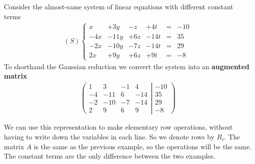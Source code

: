 \documentclass[usenames,dvipsnames,aspectratio=169,10pt]{beamer}
\numberwithin{equation}{section}
\begin{document}
\begin{frame}
Consider the almost-same system of linear equations with different constant terms
\begin{align*}
(S)
\left\{
\begin{matrix}
    x &+  3y &-  z &+  4t &=&  -10 \\
  -4x &- 11y &+ 6z &- 14t &=&   35 \\
  -2x &- 10y &- 7z &- 14t &=&   29 \\
   2x &+  9y &+ 6z &+  9t &=&   -8
\end{matrix}
\right.
\end{align*}
To shorthand the Gaussian reduction we convert the system into an \textbf{augmented matrix}
\begin{align*}
\left(
	\begin{matrix}
	   1 &   3 & -1 &   4 \\
	  -4 & -11 &  6 & -14 \\
	  -2 & -10 & -7 & -14 \\
	   2 &   9 &  6 &   9
	\end{matrix}
  \left|
	\begin{matrix}
	 -10 \\
	  35 \\
	  29 \\
	  -8
	\end{matrix}
  \right.
\right)
\end{align*}

We can use this representation to make elementary row operations, without having to write down the variables in each line. So we denote rows by $R_i$. The matrix $A$ is the same as the previous example, so the operations will be the same. The constant terms are the only difference between the two examples.
\end{frame}
\end{document}
